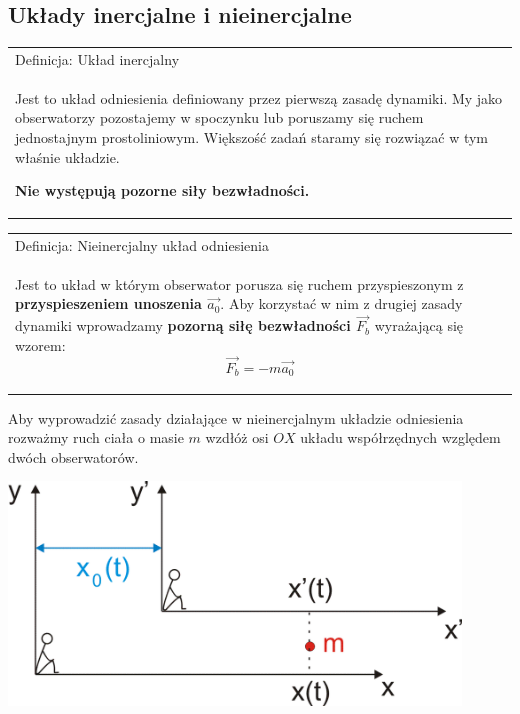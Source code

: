 \documentclass[a4paper]{article}
\newenvironment{definition}[2][Definicja]
    {
        \begin{center}
        \begin{tabular}{|p{1\textwidth}|}
        \hline
            #1: #2\\[2ex]
        \begin{em}
        \Large
    }
    { 
        \end{em}
        \\\hline
        \end{tabular} 
        \end{center}
    }
\begin{document}
    \subsection{\LARGE Układy inercjalne i nieinercjalne}
    \Large
    \begin{definition}{Układ inercjalny}
        Jest to układ odniesienia definiowany przez pierwszą zasadę dynamiki. My jako obserwatorzy
        pozostajemy w spoczynku lub poruszamy się ruchem jednostajnym prostoliniowym. Większość 
        zadań staramy się rozwiązać w tym właśnie układzie. 

        \textbf{Nie występują pozorne siły bezwładności.}
    \end{definition}
    \begin{definition}{Nieinercjalny układ odniesienia}
        Jest to układ w którym obserwator porusza się ruchem przyspieszonym z \textbf{przyspieszeniem
        unoszenia $\vec{a_0}$}. Aby korzystać w nim z 
        drugiej zasady dynamiki wprowadzamy \textbf{pozorną siłę bezwładności $\vec{F_b}$} wyrażającą się wzorem:
        \[\vec{F_b} = -m\vec{a_0}\]
    \end{definition}    
    Aby wyprowadzić zasady działające w nieinercjalnym układzie odniesienia rozważmy ruch ciała
    o masie $m$ wzdłóż osi $OX$ układu współrzędnych względem dwóch obserwatorów.

    \begin{center}
        \includegraphics[width=0.9\textwidth]{img/nuo.png}
    \end{center}
\end{document}
